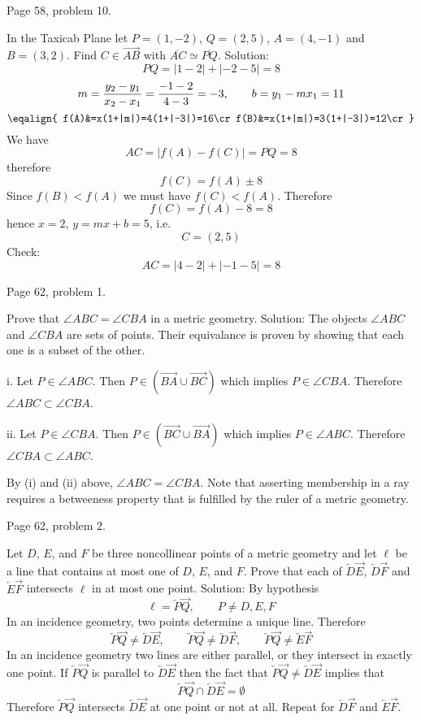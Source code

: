 \beginsection Page 58, problem 10.

In the Taxicab Plane let $P=(1,-2)$, $Q=(2,5)$,
$A=(4,-1)$ and $B=(3,2)$.
Find $C\in\overrightarrow{AB}$ with $\overline{AC}\simeq\overline{PQ}$.
\medskip\noindent
Solution:
$$PQ=|1-2|+|-2-5|=8$$
$$m={y_2-y_1\over x_2-x_1}={-1-2\over4-3}=-3,
\qquad b=y_1-mx_1=11$$
$$\eqalign{
f(A)&=x(1+|m|)=4(1+|-3|)=16\cr
f(B)&=x(1+|m|)=3(1+|-3|)=12\cr
}$$
We have
$$AC=|f(A)-f(C)|=PQ=8$$
therefore
$$f(C)=f(A)\pm8$$
Since $f(B)<f(A)$ we must have $f(C)<f(A)$. Therefore
$$f(C)=f(A)-8=8$$
hence $x=2$, $y=mx+b=5$, i.e.
$$C=(2,5)$$
Check:
$$AC=|4-2|+|-1-5|=8$$

\beginsection Page 62, problem 1.

Prove that $\angle ABC=\angle CBA$ in a metric geometry.
\medskip\noindent
Solution:
The objects $\angle ABC$ and $\angle CBA$ are sets of points.
Their equivalance is proven by showing that
each one is a subset of the other.
\item{i.} Let $P\in\angle ABC$.
Then $P\in(\overrightarrow{BA}\cup\overrightarrow{BC})$
which implies $P\in\angle CBA$.
Therefore $\angle ABC\subset\angle CBA$.
\item{ii.} Let $P\in\angle CBA$.
Then $P\in(\overrightarrow{BC}\cup\overrightarrow{BA})$
which implies $P\in\angle ABC$.
Therefore $\angle CBA\subset\angle ABC$.
\par\noindent
By (i) and (ii) above, $\angle ABC=\angle CBA$.
Note that asserting membership in a ray
requires a betweeness property that is fulfilled by the ruler
of a metric geometry.

\beginsection Page 62, problem 2.

Let $D$, $E$, and $F$ be three noncollinear points of a metric geometry
and let $\ell$ be a line that contains at most one of $D$, $E$, and $F$.
Prove that each of
$\overleftarrow D\overrightarrow E$,
$\overleftarrow D\overrightarrow F$ and
$\overleftarrow E\overrightarrow F$ intersects $\ell$ in at most one point.
\medskip\noindent
Solution:
By hypothesis
$$\ell=\overleftarrow P\overrightarrow Q,\qquad P\ne D,E,F$$
In an incidence geometry, two points determine a unique line.
Therefore
$$
\overleftarrow P\overrightarrow Q\ne\overleftarrow D\overrightarrow E,\qquad
\overleftarrow P\overrightarrow Q\ne\overleftarrow D\overrightarrow F,\qquad
\overleftarrow P\overrightarrow Q\ne\overleftarrow E\overrightarrow F
$$
In an incidence geometry two lines are either parallel, or they intersect in
exactly one point.
If $\overleftarrow P\overrightarrow Q$ is parallel to
$\overleftarrow D\overrightarrow E$ then the fact that
$\overleftarrow P\overrightarrow Q\ne\overleftarrow D\overrightarrow E$
implies that
$$\overleftarrow P\overrightarrow Q\cap\overleftarrow D\overrightarrow E=\emptyset$$
Therefore $\overleftarrow P\overrightarrow Q$ intersects
$\overleftarrow D\overrightarrow E$ at one point or not at all.
Repeat for $\overleftarrow D\overrightarrow F$ and
$\overleftarrow E\overrightarrow F$.

